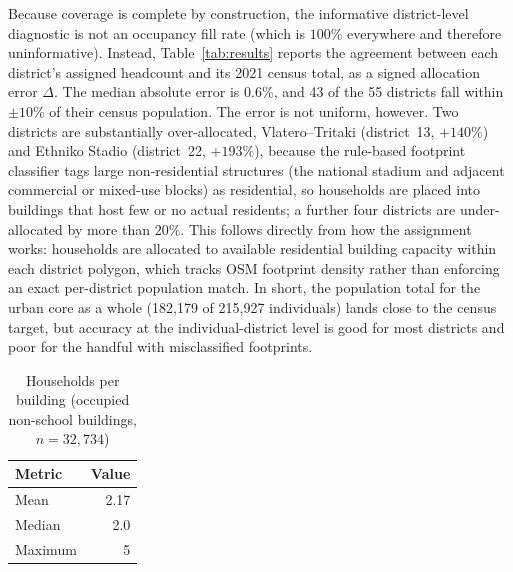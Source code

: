 \documentclass{article}
\begin{document}
Because coverage is complete by construction, the informative district-level diagnostic is not an occupancy fill rate (which is $100\%$ everywhere and therefore uninformative). Instead, Table~\ref{tab:results} reports the agreement between each district's assigned headcount and its 2021 census total, as a signed allocation error $\Delta$. The median absolute error is $0.6\%$, and 43 of the 55 districts fall within $\pm10\%$ of their census population. The error is not uniform, however. Two districts are substantially over-allocated, Vlatero--Tritaki (district~13, $+140\%$) and Ethniko Stadio (district~22, $+193\%$), because the rule-based footprint classifier tags large non-residential structures (the national stadium and adjacent commercial or mixed-use blocks) as residential, so households are placed into buildings that host few or no actual residents; a further four districts are under-allocated by more than $20\%$. This follows directly from how the assignment works: households are allocated to available residential building capacity within each district polygon, which tracks OSM footprint density rather than enforcing an exact per-district population match. In short, the population total for the urban core as a whole (182,179 of 215,927 individuals) lands close to the census target, but accuracy at the individual-district level is good for most districts and poor for the handful with misclassified footprints.

\begin{table}[htbp]
\centering
\begin{tabular}{lr}
\toprule
\textbf{Metric} & \textbf{Value} \\
\midrule
Mean   & 2.17 \\
Median & 2.0 \\
Maximum & 5 \\
\bottomrule
\end{tabular}
\caption{Households per building (occupied non-school buildings, $n=32{,}734$)}
\label{tab:households_per_building}
\end{table}
\end{document}
